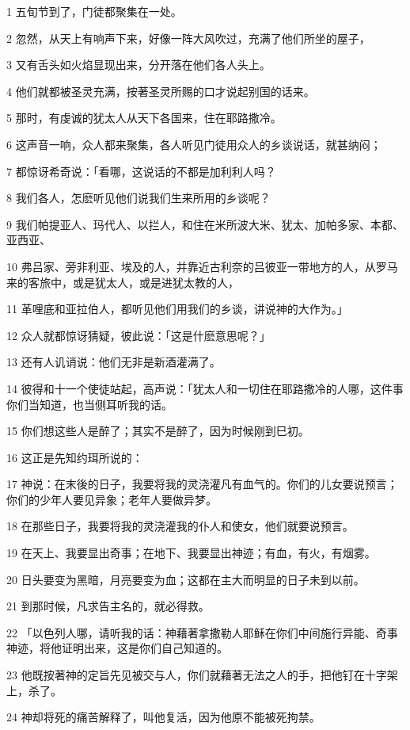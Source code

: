 \par 1 五旬节到了，门徒都聚集在一处。
\par 2 忽然，从天上有响声下来，好像一阵大风吹过，充满了他们所坐的屋子，
\par 3 又有舌头如火焰显现出来，分开落在他们各人头上。
\par 4 他们就都被圣灵充满，按著圣灵所赐的口才说起别国的话来。
\par 5 那时，有虔诚的犹太人从天下各国来，住在耶路撒冷。
\par 6 这声音一响，众人都来聚集，各人听见门徒用众人的乡谈说话，就甚纳闷；
\par 7 都惊讶希奇说：「看哪，这说话的不都是加利利人吗？
\par 8 我们各人，怎麽听见他们说我们生来所用的乡谈呢？
\par 9 我们帕提亚人、玛代人、以拦人，和住在米所波大米、犹太、加帕多家、本都、亚西亚、
\par 10 弗吕家、旁非利亚、埃及的人，并靠近古利奈的吕彼亚一带地方的人，从罗马来的客旅中，或是犹太人，或是进犹太教的人，
\par 11 革哩底和亚拉伯人，都听见他们用我们的乡谈，讲说神的大作为。」
\par 12 众人就都惊讶猜疑，彼此说：「这是什麽意思呢？」
\par 13 还有人讥诮说：他们无非是新酒灌满了。
\par 14 彼得和十一个使徒站起，高声说：「犹太人和一切住在耶路撒冷的人哪，这件事你们当知道，也当侧耳听我的话。
\par 15 你们想这些人是醉了；其实不是醉了，因为时候刚到巳初。
\par 16 这正是先知约珥所说的：
\par 17 神说：在末後的日子，我要将我的灵浇灌凡有血气的。你们的儿女要说预言；你们的少年人要见异象；老年人要做异梦。
\par 18 在那些日子，我要将我的灵浇灌我的仆人和使女，他们就要说预言。
\par 19 在天上、我要显出奇事；在地下、我要显出神迹；有血，有火，有烟雾。
\par 20 日头要变为黑暗，月亮要变为血；这都在主大而明显的日子未到以前。
\par 21 到那时候，凡求告主名的，就必得救。
\par 22 「以色列人哪，请听我的话：神藉著拿撒勒人耶稣在你们中间施行异能、奇事神迹，将他证明出来，这是你们自己知道的。
\par 23 他既按著神的定旨先见被交与人，你们就藉著无法之人的手，把他钉在十字架上，杀了。
\par 24 神却将死的痛苦解释了，叫他复活，因为他原不能被死拘禁。
